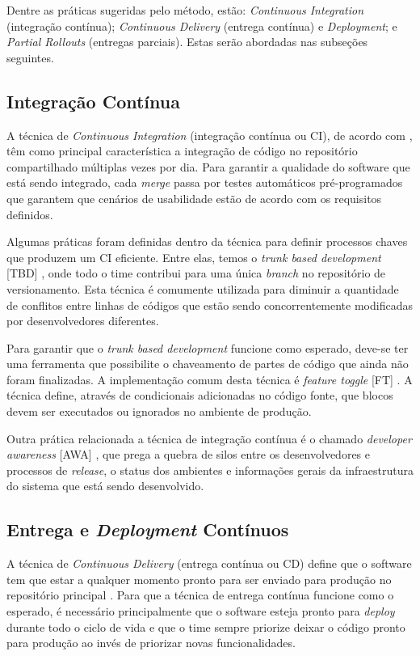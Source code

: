Dentre as práticas sugeridas pelo método, estão: \emph{Continuous Integration} (integração contínua);  \emph{Continuous Delivery} (entrega contínua) e \emph{Deployment}; e \emph{Partial Rollouts} (entregas parciais). Estas serão abordadas nas subseções seguintes.

\subsection{Integração Contínua}

A técnica de \emph{Continuous Integration} (integração contínua ou CI), de acordo com \cite{fowlerCI}, têm como principal característica a integração de código no repositório compartilhado múltiplas vezes por dia. Para garantir a qualidade do software que está sendo integrado, cada \emph{merge} passa por testes automáticos pré-programados que garantem que cenários de usabilidade estão de acordo com os requisitos definidos. 

Algumas práticas foram definidas dentro da técnica para definir processos chaves que produzem um CI eficiente. Entre elas, temos o \emph{trunk based development} [TBD] \cite{devAndDeploymentFB}, onde todo o time contribui para uma única \emph{branch} no repositório de versionamento. Esta técnica é comumente utilizada para diminuir a quantidade de conflitos entre linhas de códigos que estão sendo concorrentemente modificadas por desenvolvedores diferentes. 

Para garantir que o \emph{trunk based development} funcione como esperado, deve-se ter uma ferramenta que possibilite o chaveamento de partes de código que ainda não foram finalizadas. A implementação comum desta técnica é \emph{feature toggle} [FT] \cite{featureToggles}. A técnica define, através de condicionais adicionadas no código fonte, que blocos devem ser executados ou ignorados no ambiente de produção.

Outra prática relacionada a técnica de integração contínua é o chamado \emph{developer awareness} [AWA] \cite{awa}, que prega a quebra de silos entre os desenvolvedores e processos de \emph{release}, o status dos ambientes e informações gerais da infraestrutura do sistema que está sendo desenvolvido.

\subsection{Entrega e \emph{Deployment} Contínuos}

A técnica de \emph{Continuous Delivery} (entrega contínua ou CD) define que o software tem que estar a qualquer momento pronto para ser enviado para produção no repositório principal \cite{fowlerCD}. Para que a técnica de entrega contínua funcione como o esperado, é necessário principalmente que o software esteja pronto para \emph{deploy} durante todo o ciclo de vida e que o time sempre priorize deixar o código pronto para produção ao invés de priorizar novas funcionalidades.

